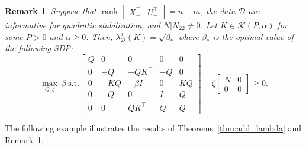 \documentclass[9pt,shortpaper,twoside,web]{ieeecolor}
\DeclareMathOperator{\rank}{rank}
\newcommand{\mac}[1]{\mathcal{#1}}
\newtheorem{remark}[theorem]{Remark}
\begin{document}
\begin{remark}
\label{reM:lam_dd_optK}
Suppose that $\rank\begin{bmatrix}
        X^\top_- & U^\top_-
    \end{bmatrix}=n+m$, the data $\mac{D}$ are informative for quadratic stabilization, and $N|\bar{N}_{22}\neq0$. Let $K \in \mac{K}(P,\alpha)$ for some $P>0$ and $\alpha \geq 0$. Then, $\lambda^\text{a}_\mac{D}(K)=\sqrt{\beta_*}$ where $\beta_*$ is the optimal value of the following SDP:
    \begin{equation}
    \label{eq:SDP_add_lambda_s_K}
        \max_{Q,\zeta} \ \beta \ \text{s.t.}  
        \begin{bmatrix}
            Q & 0 & 0 & 0 & 0\\
            0 & -Q & -QK^\top & -Q & 0\\
            0 & -KQ & -\beta I & 0 & KQ\\
            0 & -Q & 0 & I & Q\\
            0 & 0 & QK^\top & Q & Q 
        \end{bmatrix}\!-\zeta\begin{bmatrix}
            N & 0 \\ 0 & 0
        \end{bmatrix} \geq 0.
    \end{equation}
\end{remark}




The following example illustrates the results of Theorems~\ref{thm:add_lambda} and Remark~\ref{reM:lam_dd_optK}.
\end{document}
